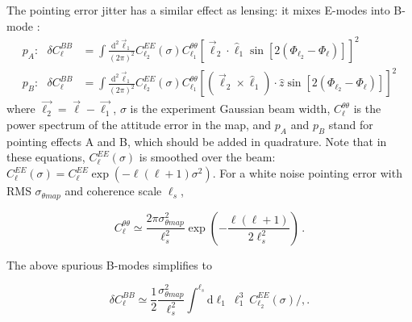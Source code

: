 The pointing error jitter has a similar effect as lensing: it mixes E-modes into B-mode \cite{hu03}:
\begin{align} 
\label{eq: bmodes from attitude errors pa}
p_A: \,\,\,\, \delta C_{\ell}^{BB} &= \int \frac{\mathrm{d^2} \vec{{\ell}}_1}{(2\pi)^2}   C^{EE}_{{\ell}_2}(\sigma) C^{\theta \theta}_{{\ell}_1} [\vec{{\ell}}_2 \cdot              \hat{{\ell}}_1 \sin[2(\Phi_{{\ell}_2} - \Phi_{\ell})]]^2 \\
\label{eq: bmodes from attitude errors pb}
p_B: \,\,\,\, \delta C_{\ell}^{BB} &= \int \frac{\mathrm{d^2} \vec{{\ell}}_1}{(2\pi)^2}   C^{EE}_{{\ell}_2}(\sigma) C^{\theta \theta}_{{\ell}_1} [(\vec{{\ell}}_2 \times            \hat{{\ell}}_1) \cdot \hat{z} \sin[2(\Phi_{{\ell}_2} - \Phi_{\ell})]]^2 
\end{align}
\noindent where  $\vec{{\ell}_2} = \vec{{\ell}} - \vec{{\ell}_1}$, $\sigma$ is the experiment Gaussian beam width, $C_{\ell}^{\theta \theta}$ is the power spectrum of the attitude error in the map, and $p_A$ and $p_B$ stand for pointing effects A and B, which should be added in quadrature.
Note that in these equations, $C_{\ell}^{EE}(\sigma)$ is smoothed over the beam:  $C^{EE}_{\ell}(\sigma) = C^{EE}_{\ell} \exp{(-{\ell}({\ell}+1)\sigma^2)}$.
For a white noise pointing error with RMS $\sigma_{\theta map}$ and coherence scale $\ell_s$,

\begin{equation}
 C^{\theta \theta}_{\ell} \simeq \frac{2\pi\sigma_{\theta map}^2}{{\ell}_s^2}\exp(-\frac{{\ell}({\ell}+1)}{2{\ell}_s^2}) \, .
\end{equation}

\noindent The above spurious B-modes simplifies to

\begin{equation}
\delta  C_{\ell}^{BB} \simeq  \frac{1}{2}\frac{\sigma_{\theta map}^2}{{\ell}_s^2}         \int^{{\ell}_s} \mathrm{d}{\ell}_1 \ {\ell}_1^3 \ C^{EE}_{{\ell}_2}(\sigma) /, .
\end{equation}


